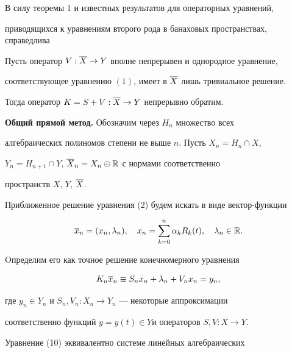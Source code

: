 В силу теоремы 1 и известных результатов для операторных уравнений, 


приводящихся к уравнениям второго рода в банаховых пространствах, справедлива








\begin{thm}


Пусть оператор $V:\overline{X}\to Y$ вполне непрерывен и однородное уравнение, 


соответствующее уравнению $(1)$, имеет в $\overline{X}$ лишь тривиальное решение. 


Тогда оператор $K = S + V:\overline{X}\to Y$ непрерывно обратим.


\end{thm}





{\bf Общий прямой метод.} Обозначим через $H_n$ множество всех 


алгебраических полиномов степени не выше $n$. Пусть $X_n = H_n \cap X$,


$Y_n = H_{n+1} \cap Y$, $\overline{X}_n = X_n \oplus \Bbb{R}$ с нормами соответственно 


пространств $X$, $Y$, $\overline{X}$.





Приближенное решение уравнения (2) будем искать в виде вектор-функции


\begin{equation}


\ol{x}_n = (x_n,\lambda_n),\quad x_n = \sum_{k=0}^n\alpha_k R_k(t),


\quad \lambda_n\in \R.


\end{equation}


Oпределим его как точное решение конечномерного уравнения


\begin{equation}


K_n\ol{x}_n \equiv S_n x_n +\lambda_n + V_n x_n = y_n,


\end{equation}


где $y_n\in Y_n$ и $S_n, V_n:X_n\to Y_n$ --- некоторые аппроксимации 


соответственно функций $y=y(t)\in Y$и операторов $S, V:X\to Y$.


Уравнение (10) эквивалентно системе линейных алгебраических


